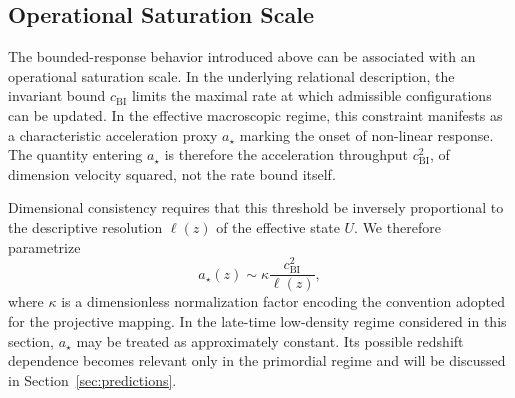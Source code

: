 \subsection{Operational Saturation Scale}
  \label{subsec:operational_saturation_scale}

  The bounded-response behavior introduced above can be associated with
  an operational saturation scale.
  In the underlying relational description, the invariant bound $c_{\mathrm{BI}}$
  limits the maximal rate at which admissible configurations can be updated.
  In the effective macroscopic regime, this constraint manifests as a
  characteristic acceleration proxy $a_\star$ marking the onset of
  non-linear response.
  The quantity entering $a_\star$ is therefore the acceleration throughput
  $c_{\mathrm{BI}}^2$, of dimension velocity squared, not the rate bound itself.

  Dimensional consistency requires that this threshold be inversely
  proportional to the descriptive resolution $\ell(z)$ of the effective
  state $U$.
  We therefore parametrize
  \begin{equation}
    \label{eq:astar_param}
    a_\star(z) \sim \kappa \frac{c_{\mathrm{BI}}^2}{\ell(z)},
  \end{equation}
  where $\kappa$ is a dimensionless normalization factor encoding the
  convention adopted for the projective mapping.
  In the late-time low-density regime considered in this section,
  $a_\star$ may be treated as approximately constant.
  Its possible redshift dependence becomes relevant only in the
  primordial regime and will be discussed in Section~\ref{sec:predictions}.
